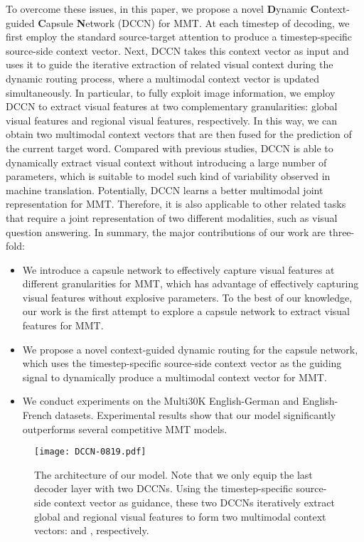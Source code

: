 \documentclass[sigconf]{acmart}
\begin{document}
To overcome these issues, in this paper, we propose a novel \textbf{D}ynamic \textbf{C}ontext-guided \textbf{C}apsule \textbf{N}etwork (DCCN) for MMT. 
At each timestep of decoding, 
we first employ the standard source-target attention to produce a timestep-specific source-side context vector. 
Next, 
DCCN takes this context vector as input and uses it to guide the iterative extraction of related visual context during the dynamic routing process, 
where a multimodal context vector is updated simultaneously. 
In particular, to fully exploit image information, we employ DCCN to extract visual features at  two complementary granularities: global visual features and regional visual features, respectively. 
In this way, we can obtain two multimodal context vectors that are then fused for the prediction of the current target word. Compared with previous studies, 
DCCN is able to dynamically extract visual context without introducing a large number of parameters, which is suitable to  model such kind of variability observed in machine translation. 
Potentially, DCCN learns a better multimodal joint representation for MMT. Therefore, it is also applicable to other related tasks that require a joint representation of two different modalities, such as visual question answering.
In summary, 
the major contributions of our work are three-fold: 
\begin{itemize}
\item 
We introduce a capsule network to effectively capture visual features at different granularities for MMT, 
which has advantage of effectively capturing visual features without explosive parameters. To the best of our knowledge, our work is the first attempt to explore a capsule network to extract visual features for MMT.

\item
We propose a novel context-guided dynamic routing for the capsule network,
which uses the timestep-specific source-side context vector as the guiding signal to dynamically produce a multimodal context vector for MMT. 

\item 
We conduct experiments on the Multi30K English-German and English-French datasets. Experimental results show that our model significantly outperforms several competitive MMT models.
\end{itemize}

\begin{figure*}[h]
\centering
\texttt{[image: DCCN-0819.pdf]} \caption{The architecture of our model. 
Note that we only equip the last decoder layer with two DCCNs. Using the timestep-specific source-side context vector  as guidance, these two DCCNs iteratively extract global and regional visual features to form two multimodal context vectors:  and , respectively.
}
\label{fig1}
\end{figure*}
\end{document}
